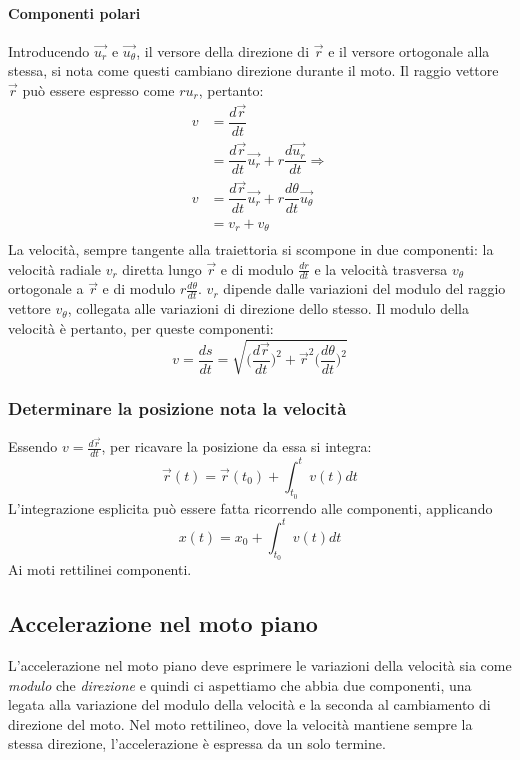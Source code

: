 \documentclass[class=book, crop=false, oneside, 12pt]{standalone}
\begin{document}
			\paragraph{Componenti polari}
      Introducendo $\overrightarrow{u_r}$ e $\overrightarrow{u_\theta}$, il versore della direzione di $\overrightarrow{r}$ e il versore ortogonale alla stessa, si nota come questi cambiano direzione durante il moto.
      Il raggio vettore $\overrightarrow{r}$ pu\`o essere espresso come $ru_r$, pertanto:
			\begin{align*}
        v&=\dfrac{d\overrightarrow{r}}{dt}\\
         &=\dfrac{d\overrightarrow{r}}{dt}\overrightarrow{u_r}+r\dfrac{d\overrightarrow{u_r}}{dt}\Rightarrow\\
        v&=\dfrac{d\overrightarrow{r}}{dt}\overrightarrow{u_r}+r\dfrac{d\theta}{dt}\overrightarrow{u_\theta}\\
				 &=v_r+v_\theta\\
			\end{align*}
      La velocit\`a, sempre tangente alla traiettoria si scompone in due componenti: la velocit\`a radiale $v_r$ diretta lungo $\overrightarrow{r}$ e di modulo $\frac{dr}{dt}$ e la velocit\`a trasversa $v_\theta$ ortogonale a $\overrightarrow{r}$ e di modulo $r\frac{d\theta}{dt}$.
			$v_r$ dipende dalle variazioni del modulo del raggio vettore $v_\theta$, collegata alle variazioni di direzione dello stesso.
			Il modulo della velocit\`a \`e pertanto, per queste componenti:
      $$v=\dfrac{ds}{dt}=\sqrt{\biggl(\dfrac{d\overrightarrow{r}}{dt}\biggr)^2+\overrightarrow{r}^2\biggl(\dfrac{d\theta}{dt}\biggr)^2}$$
		\subsubsection{Determinare la posizione nota la velocit\`a}
    Essendo $v=\frac{d\overrightarrow{r}}{dt}$, per ricavare la posizione da essa si integra:
    $$\overrightarrow{r}(t)=\overrightarrow{r}(t_0)+\int_{t_0}^tv(t)dt$$
		L'integrazione esplicita pu\`o essere fatta ricorrendo alle componenti, applicando
		$$x(t)=x_0+\int_{t_0}^tv(t)dt$$
		Ai moti rettilinei componenti.
  \subsection{Accelerazione nel moto piano}
  L'accelerazione nel moto piano deve esprimere le variazioni della velocità sia come \emph{modulo} che \emph{direzione} e quindi ci aspettiamo che abbia due componenti,
  una legata alla variazione del modulo della velocità e la seconda al cambiamento di direzione del moto.
  Nel moto rettilineo, dove la velocità mantiene sempre la stessa direzione, l'accelerazione è espressa da un solo termine.
\end{document}
